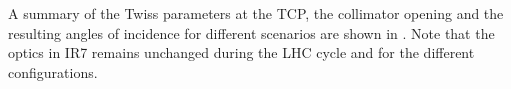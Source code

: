 




%
A summary of the Twiss parameters at the TCP, the collimator opening and the resulting angles of incidence for different scenarios are shown in . Note that the optics in IR7 remains unchanged during the LHC cycle and for the different configurations. 

